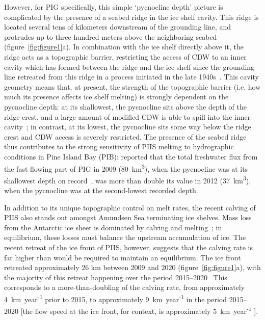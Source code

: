 \documentclass[draft]{agujournal2019}
\begin{document}
However, for PIG specifically, this simple `pycnocline depth' picture is complicated by the presence of a seabed ridge in the ice shelf cavity. This ridge is located several tens of kilometers downstream of the grounding line, and protrudes up to three hundred meters above the neighboring seabed (figure~\ref{fig:figure1}a). In combination with the ice shelf directly above it, the ridge acts as a topographic barrier, restricting the access of CDW to an inner cavity which has formed between the ridge and the ice shelf since the grounding line retreated from this ridge in a process initiated in the late 1940s~\cite{Jenkins2010NatureGeo, DeRydt2014JGeophysResOceans, DeRydt2016JGeophysResEarthSurf, Smith2017Nature}. This cavity geometry means that, at present, the strength of the topographic barrier (i.e. how much its presence affects ice shelf melting) is strongly dependent on the pycnocline depth: at its shallowest, the pycnocline sits above the depth of the ridge crest, and a large amount of modified CDW is able to spill into the inner cavity~\cite{Dutrieux2014Science}; in contrast, at its lowest, the pycnocline sits some way below the ridge crest and CDW access is severely restricted.  The presence of the seabed ridge thus contributes to the strong sensitivity of PIIS melting to hydrographic conditions in Pine Island Bay (PIB):  reported that the total freshwater flux from the fast flowing part of PIG in 2009 (80~km\textsuperscript{3}), when the pycnocline was at its shallowest depth on record~\cite{Webber2017NatureComms}, was more than double its value in 2012 (37~km\textsuperscript{3}), when the pycnocline was at the second-lowest recorded depth.

In addition to its unique topographic control on melt rates, the recent calving of PIIS also stands out amongst Amundsen Sea terminating ice shelves. Mass loss from the Antarctic ice sheet is dominated by calving and melting~\cite{Rignot2013Science}; in equilibrium, these losses must balance the upstream accumulation of ice. The recent retreat of the ice front of PIIS, however, suggests that the calving rate is far higher than would be required to maintain an equilibrium. The ice front retreated approximately 26 km between 2009 and 2020 (figure~\ref{fig:figure1}a), with the majority of this retreat happening over the period 2015--2020~\cite{Lhermitte2020PNAS, Joughin2021ScienceAdv} This corresponds to a more-than-doubling of the calving rate, from approximately 4~km~year\textsuperscript{-1} prior to 2015, to approximately 9~km~year\textsuperscript{-1} in the period 2015--2020 [the flow speed at the ice front, for context, is approximately 5~km~year\textsuperscript{-1} \cite{Joughin2021ScienceAdv}].
\end{document}
